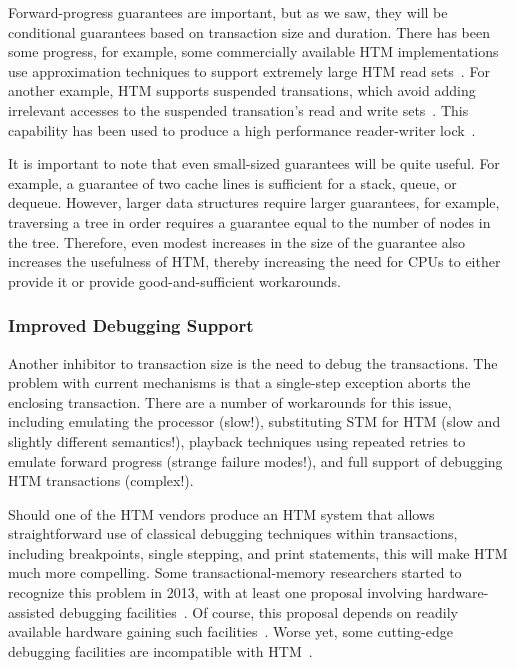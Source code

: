 Forward-progress guarantees are important, but as we saw, they will
be conditional guarantees based on transaction size and duration.
There has been some progress, for example, some commercially available
HTM implementations use approximation techniques to support extremely
large HTM read sets~\cite{RaviRajwar2012TSX}.
For another example,  HTM supports suspended transations, which
avoid adding irrelevant accesses to the suspended transation's read and
write sets~\cite{Le:2015:TMS:3266491.3266500}.
This capability has been used to produce a high performance
reader-writer lock~\cite{PascalFelber2016rwlockElision}.

It is important to note that even small-sized guarantees will be
quite useful.
For example,
a guarantee of two cache lines is sufficient for a stack, queue, or dequeue.
However, larger data structures require larger guarantees, for example,
traversing a tree in order requires a guarantee equal to the number
of nodes in the tree.
Therefore, even modest increases in the size of the guarantee also
increases the usefulness of HTM, thereby increasing the need for CPUs
to either provide it or provide good-and-sufficient workarounds.

\subsubsection{Improved Debugging Support}
\label{sec:future:Improved Debugging Support}

Another inhibitor to transaction size is the need to debug the transactions.
The problem with current mechanisms is that a single-step exception
aborts the enclosing transaction.
There are a number of workarounds for this issue, including emulating
the processor (slow!), substituting STM for HTM (slow and slightly
different semantics!),
playback techniques using repeated retries to emulate forward
progress (strange failure modes!), and
full support of debugging HTM transactions (complex!).

Should one of the HTM vendors produce an HTM system that allows
straightforward use of classical debugging techniques within
transactions, including breakpoints, single stepping, and
print statements, this will make HTM much more compelling.
Some transactional-memory researchers started to recognize this
problem in 2013, with at least one proposal involving hardware-assisted
debugging facilities~\cite{JustinGottschlich2013TMdebug}.
Of course, this proposal depends on readily available hardware gaining such
facilities~\cite{TimothyHayes2020ARM-HTM,Intel2020TSXdevguide}.
Worse yet, some cutting-edge debugging facilities are incompatible
with HTM~\cite{RobertOCallahan2020DebuggingHTM}.

